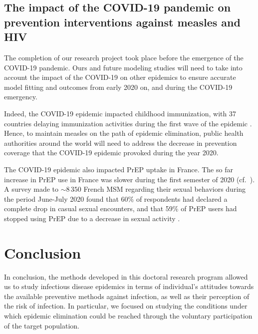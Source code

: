 \subsection{The impact of the COVID-19 pandemic on prevention interventions against measles and HIV}
The completion of our research project took place before the emergence of the COVID-19 pandemic. Ours and future modeling studies will need to take into account the impact of the COVID-19 on other epidemics to ensure accurate model fitting and outcomes from early 2020 on, and during the COVID-19 emergency.

Indeed, the COVID-19 epidemic impacted childhood immunization, with 37 countries delaying immunization activities during the first wave of the epidemic \cite[]{WHO_CovidMeasles}. Hence, to maintain measles on the path of epidemic elimination, public health authorities around the world will need to address the decrease in prevention coverage that the COVID-19 epidemic provoked during the year 2020. 

The COVID-19 epidemic also impacted PrEP uptake in France. The so far increase in PrEP use in France was slower during the first semester of 2020 (cf.~). A survey made to $\sim8\,350$ French MSM regarding their sexual behaviors during the period June-July 2020 found that 60\% of respondents had declared a complete drop in casual sexual encounters, and that 59\% of PrEP users had stopped using PrEP due to a decrease in sexual activity \cite[]{Velter2020}.

%

\section{Conclusion}
In conclusion, the methods developed in this doctoral research program allowed us to study infectious disease epidemics in terms of individual's attitudes towards the available preventive methods against infection, as well as their perception of the risk of infection. In particular, we focused on studying the conditions under which epidemic elimination could be reached through the voluntary participation of the target population.

